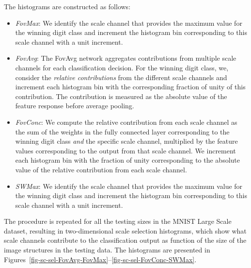 \documentclass[twocolumn,runningheads]{svjour3}
\begin{document}
The histograms are constructed as follows:
\begin{itemize}
    \item \emph{FovMax}: We identify the scale channel that provides the maximum value for the winning digit class and increment the histogram bin corresponding to this scale channel with a unit increment.
    \item \emph{FovAvg}: The FovAvg network aggregates contributions from multiple scale channels for each classification decision. For the winning digit class, we, consider the \emph{relative contributions} from the different scale channels and increment each histogram bin with the corresponding fraction of unity of this contribution. The contribution is measured as the absolute value of the feature response before average pooling.
    \item \emph{FovConc}: We compute the relative contribution from each scale channel as the sum of the weights in the fully connected layer corresponding to the winning digit class \emph{and} the specific scale channel, multiplied by the feature values corresponding to the output from that scale channel. We increment each histogram bin with the fraction of unity corresponding to the absolute value of the relative contribution from each scale channel. 
    \item \emph{SWMax}: We identify the scale channel that provides the maximum value for the winning digit class and increment the histogram bin corresponding to this scale channel with a unit increment. 
\end{itemize}
The procedure is repeated for all the testing sizes in the MNIST Large Scale dataset, resulting in two-dimensional scale
selection histograms, which show what scale channels contribute to the classification output
as function of the size of the image structures in the testing data. The histograms are presented in
Figures~\ref{fig-sc-sel-FovAvg-FovMax}--\ref{fig-sc-sel-FovConc-SWMax}.
\end{document}
